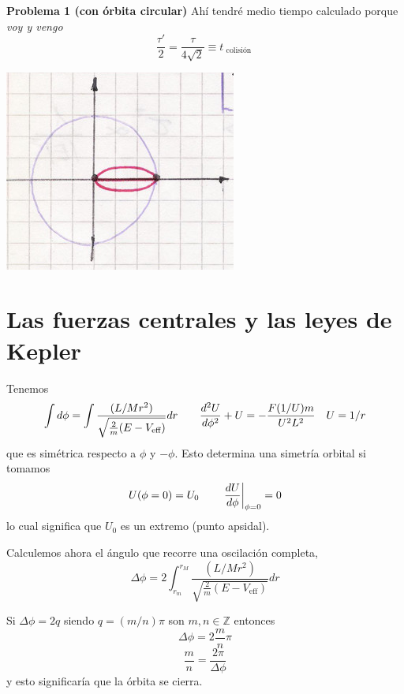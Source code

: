 \documentclass[10pt,oneside]{CBFT_book}
\begin{document}
\begin{ejemplo}{\bf Problema 1 (con órbita circular)}
Ahí tendré medio tiempo calculado porque {\it voy y vengo}
\[
	\frac{\tau'}{2} = \frac{\tau}{4\sqrt{2}} \equiv t_\text{ colisión }
\]

\includegraphics[scale=0.3]{images/fig_mc_potencial_energy_elipses2.jpg}

\end{ejemplo}



\section{Las fuerzas centrales y las leyes de Kepler}

Tenemos 
\[
	\int d\phi = \int \frac{(L/Mr^2)}{\sqrt{ \frac{2}{m}(E - V_{\text{eff}})}} dr	\qquad
	\dtot[2]{U}{\phi} + U  = - \frac{F(1/U) m}{U^2 L^2} \quad U = 1/r
\]
que es simétrica respecto a $\phi$ y $-\phi$. Esto determina una simetría orbital si
tomamos
\[
	U(\phi=0) = U_0 	\qquad		\left. \dtot{U}{\phi} \right|_{\phi=0}= 0
\]
lo cual significa que $U_0$ es un extremo (punto apsidal).

Calculemos ahora el ángulo que recorre una oscilación completa,
\[
	\Delta \phi = 2\int_{r_m}^{r_M} \frac{(L/Mr^2)}{\sqrt{ \frac{2}{m}(E - V_{\text{eff}})}} dr
\]

Si $\Delta \phi = 2 q $ siendo $q= (m/n)\pi $ son $m,n \in \mathbb{Z}$ entonces
\[
	\Delta \phi = 2 \frac{m}{n} \pi 
\]
\[
	\frac{m}{n} = \frac{2\pi}{\Delta \phi}
\]
y esto significaría que la órbita se cierra.
\end{document}
